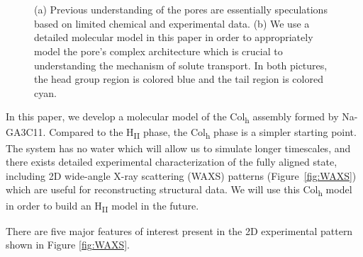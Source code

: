 \documentclass[journal=jpcbfk,manuscript=article]{achemso}
\begin{document}
\begin{figure}[!htb]
\begin{subfigure}{0.45\linewidth}
		\caption{}~\label{fig:detailed_pore}
	\end{subfigure}
    \caption{(a) Previous understanding of the pores are essentially speculations 
    based on limited chemical and experimental data. (b) We use a detailed molecular 
    model in this paper in order to appropriately model the pore's complex architecture
    which is crucial to understanding the mechanism of solute transport. In both 
    pictures, the head group region is colored blue and the tail region is colored cyan.}~\label{fig:detail}
  \end{figure}
 
  In this paper, we develop a molecular model of the Col\textsubscript{h} assembly 
  formed by Na-GA3C11. Compared to the H\textsubscript{II} phase, the Col\textsubscript{h}
  phase is a simpler starting point. The system has no water which will allow us
  to simulate longer timescales, and there exists detailed experimental
  characterization of the fully aligned state, including 2D wide-angle X-ray
  scattering (WAXS) patterns (Figure~\ref{fig:WAXS}) which are useful for reconstructing 
  structural data. We will use this Col\textsubscript{h} model in order to build an 
  H\textsubscript{II} model in the future.
  
  There are five major features of interest present in the 2D experimental pattern shown 
  in Figure \ref{fig:WAXS}.
\end{document}
